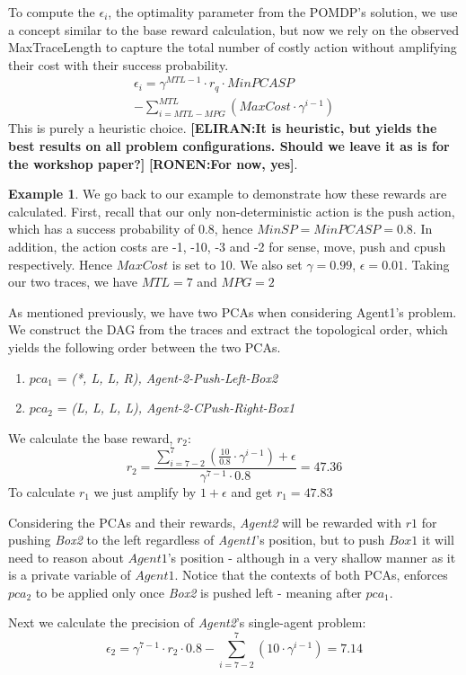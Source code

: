 \documentclass[letterpaper]{article} %
\theoremstyle{definition}
\newtheorem{example}{Example}
\newcommand{\eliran}[1]{\textbf{[\color{red}ELIRAN:#1]}}
\newcommand{\ronen}[1]{\textbf{[\color{blue}RONEN:#1]}}
\begin{document}
To compute the $\epsilon_i$, the optimality parameter from the
POMDP's solution, we use a concept similar to the base reward calculation, but now we rely on the observed MaxTraceLength to capture the total number of costly action without amplifying their cost with their success probability.
\begin{align*}
\label{eqn:rq}
   \epsilon_i = \gamma^{MTL-1}\cdot r_q \cdot MinPCASP \\
   -\sum_{i=MTL - MPG }^{MTL}(MaxCost \cdot \gamma^{i-1})
\end{align*}
This is purely a heuristic choice.
\eliran{It is heuristic, but yields the best results on all problem configurations. Should we leave it as is for the workshop paper?}
\ronen{For now, yes}.

\begin{example}
We go back to our example to demonstrate how these rewards are calculated.
First, recall that our only non-deterministic action is the push action, which has a success probability of 0.8, hence $MinSP=MinPCASP=0.8$. In addition, the action costs are -1, -10, -3 and -2 for sense, move, push and cpush respectively. Hence $MaxCost$ is set to 10. We also set $\gamma=0.99$, $\epsilon=0.01$.
Taking our two traces, we have $MTL=7$ and $MPG=2$


As mentioned previously, we have two PCAs when considering Agent1's problem.
We construct the DAG from the traces and extract the topological order, which yields the following order between the two PCAs.
\begin{enumerate}
    \item $pca_1$ = \emph{(*, L, L, R), Agent-2-Push-Left-Box2}
    \item $pca_2$ = \emph{(L, L, L, L), Agent-2-CPush-Right-Box1}
\end{enumerate}


We calculate the base reward, $r_2$:
\begin{equation}
     r_2 = \frac{\sum_{i=7-2}^{7}(\frac{10}{0.8} \cdot \gamma^{i-1})+ \epsilon}{\gamma^{7-1}\cdot 0.8} = 47.36
\end{equation}
To calculate $r_1$ we just amplify by $1+\epsilon$ and get $r_1=47.83$

Considering the PCAs and their rewards, \emph{Agent2} will be rewarded with $r1$ for pushing \emph{Box2} to the left regardless of \emph{Agent1}'s position, but to push $Box1$ it will need to reason about $Agent1$'s position - although in a very shallow manner as it is a private variable of $Agent1$.
Notice that the contexts of both PCAs, enforces $pca_2$ to be applied only once \emph{Box2} is pushed left - meaning after $pca_1$.


Next we calculate the precision of \emph{Agent2}'s single-agent problem: \begin{equation}
     \epsilon_2 = \gamma^{7-1}\cdot r_2 \cdot 0.8 - \sum_{i=7-2}^{7}(10 \cdot \gamma^{i-1}) = 7.14
\end{equation}
\end{example}
\end{document}
